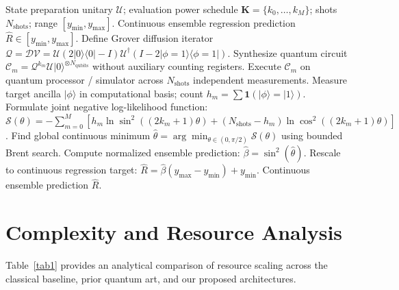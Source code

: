 \documentclass[sn-mathphys,Numbered]{sn-jnl}
\theoremstyle{thmstyleone}
\theoremstyle{thmstyletwo}
\theoremstyle{thmstylethree}
\begin{document}
\begin{algorithm}[ht]
\caption{Continuous MLAE Regression Inference Without Phase Estimation}\label{alg2}
\begin{algorithmic}[1]
\Require State preparation unitary $\mathcal{U}$; evaluation power schedule $\mathbf{K} = \{k_0, \dots, k_M\}$; shots $N_{\text{shots}}$; range $[y_{\min}, y_{\max}]$.
\Ensure Continuous ensemble regression prediction $\hat{R} \in [y_{\min}, y_{\max}]$.
\State Define Grover diffusion iterator $\mathcal{Q} = \mathcal{D}\mathcal{V} = \mathcal{U}(2|0\rangle\langle 0| - I)\mathcal{U}^\dagger (I - 2|\phi=1\rangle\langle\phi=1|)$.
    \State Synthesize quantum circuit $\mathcal{C}_m = \mathcal{Q}^{k_m}\mathcal{U}|0\rangle^{\otimes N_{\mathrm{qubits}}}$ without auxiliary counting registers.
    \State Execute $\mathcal{C}_m$ on quantum processor / simulator across $N_{\text{shots}}$ independent measurements.
    \State Measure target ancilla $|\phi\rangle$ in computational basis; count $h_m = \sum \mathbf{1}(|\phi\rangle = |1\rangle)$.
\EndFor
\State Formulate joint negative log-likelihood function:
\State \quad $\mathcal{S}(\theta) = - \sum_{m=0}^M \left[ h_m \ln \sin^2((2k_m + 1)\theta) + (N_{\text{shots}} - h_m) \ln \cos^2((2k_m + 1)\theta) \right]$.
\State Find global continuous minimum $\hat{\theta} = \arg\min_{\theta \in (0, \pi/2)} \mathcal{S}(\theta)$ using bounded Brent search.
\State Compute normalized ensemble prediction: $\hat{\beta} = \sin^2(\hat{\theta})$.
\State Rescale to continuous regression target: $\hat{R} = \hat{\beta}(y_{\max} - y_{\min}) + y_{\min}$.
\State \Return Continuous ensemble prediction $\hat{R}$.
\end{algorithmic}
\end{algorithm}

\section{Complexity and Resource Analysis}\label{sec5}

Table~\ref{tab1} provides an analytical comparison of resource scaling across the classical baseline, prior quantum art, and our proposed architectures.
\end{document}
